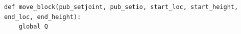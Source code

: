 






		






{\footnotesize
\begin{verbatim}
def move_block(pub_setjoint, pub_setio, start_loc, start_height, end_loc, end_height):
    global Q
\end{verbatim}}


